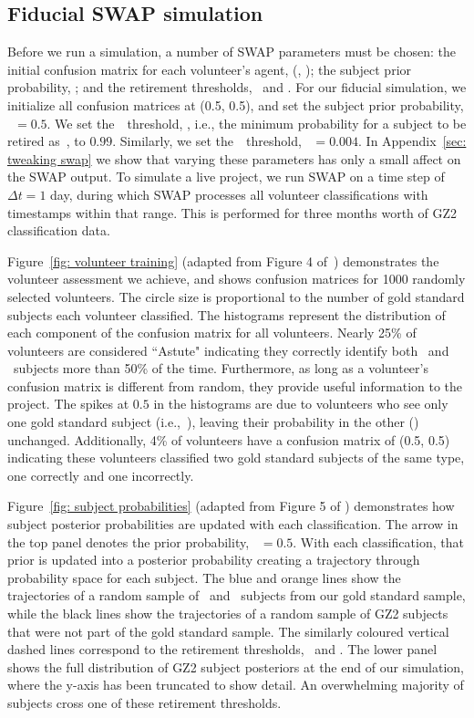 \subsection{Fiducial SWAP simulation}\label{sec: fiducial}

Before we run a simulation, a number of SWAP parameters must be chosen: 
 the initial confusion matrix for each volunteer's agent, (\Pf, \Pn);
the subject prior probability, \p; and the retirement thresholds, \tf~and \tn. 
For our fiducial  simulation, we initialize all confusion matrices at (0.5, 0.5), 
and set the subject prior probability, \p~$= 0.5$. 
We set the~\feat~threshold, \tf, i.e., the minimum probability for a subject to be retired as~\feat, to $0.99$. Similarly, we set the~\notfeat~threshold, \tn~$= 0.004$. 
In Appendix~\ref{sec: tweaking swap} 
we show that varying these parameters has only a small affect on the SWAP output. 
To simulate a live project, we run SWAP on a time step of $\Delta t = 1$ day, 
during which SWAP processes all volunteer classifications with timestamps 
within that range. This is performed for three months worth of GZ2 classification data. 


Figure~\ref{fig: volunteer training} (adapted from Figure 4 of~\citealt{Marshall2016})
demonstrates the volunteer assessment we achieve, and shows confusion matrices 
 for 1000 randomly selected volunteers. The circle size is proportional to the number of 
gold standard subjects each volunteer classified. 
The histograms represent the distribution of each component
of the confusion matrix for all volunteers.
 Nearly 25\% of volunteers are considered ``Astute"  indicating
they correctly identify both \feat~and \notfeat~subjects more than 50\% of the time. 
Furthermore, as long as a volunteer's confusion matrix is different from random, 
they provide useful information to the project.
The spikes at $0.5$ in the histograms are due to volunteers who see only one 
gold standard subject (i.e.,~\feat), leaving their probability in the 
other (\notfeat) unchanged.
Additionally, 4\% of volunteers have a confusion matrix of (0.5, 0.5) indicating these 
volunteers classified two gold standard subjects of the same type, one correctly and 
one incorrectly. 

Figure~\ref{fig: subject probabilities} (adapted from Figure 5 of \citealt{Marshall2016}) 
demonstrates how subject posterior probabilities are updated with each classification. 
The arrow in the top panel denotes the prior probability, \p~$=0.5$. 
With each classification, that prior is updated into a posterior probability creating a trajectory through probability space for each subject. 
The blue and orange lines show the trajectories of a random sample of \feat~and 
\notfeat~subjects from our gold standard sample, while the black lines show the 
trajectories of a random sample of GZ2 subjects that were not part of the 
gold standard  sample. The similarly coloured vertical dashed lines correspond to the
 retirement thresholds, \tf~and \tn. The lower panel shows the full distribution of 
GZ2 subject posteriors at the end of our simulation, where the y-axis has been truncated to show detail. An overwhelming majority of subjects cross one of these retirement thresholds.


